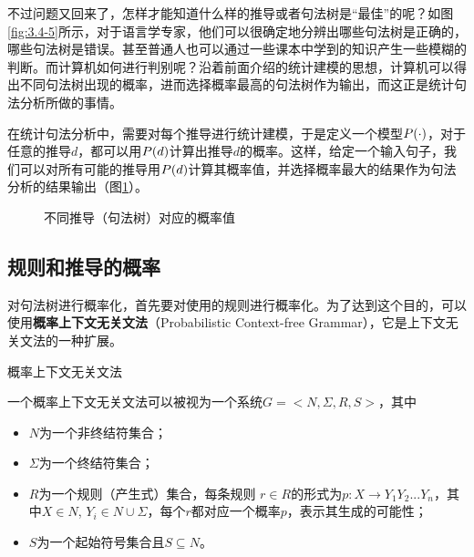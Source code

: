 \parinterval 不过问题又回来了，怎样才能知道什么样的推导或者句法树是“最佳”的呢？如图\ref{fig:3.4-5}所示，对于语言学专家，他们可以很确定地分辨出哪些句法树是正确的，哪些句法树是错误。甚至普通人也可以通过一些课本中学到的知识产生一些模糊的判断。而计算机如何进行判别呢？沿着前面介绍的统计建模的思想，计算机可以得出不同句法树出现的概率，进而选择概率最高的句法树作为输出，而这正是统计句法分析所做的事情。

\parinterval 在统计句法分析中，需要对每个推导进行统计建模，于是定义一个模型${P}( \cdot )$，对于任意的推导$d$，都可以用${P}(d)$计算出推导$d$的概率。这样，给定一个输入句子，我们可以对所有可能的推导用${P}(d)$计算其概率值，并选择概率最大的结果作为句法分析的结果输出（图\ref{fig:3.4-6}）。

\begin{figure}[htp]
    \centering

	\caption{不同推导（句法树）对应的概率值}
    \label{fig:3.4-6}
\end{figure}


\subsection{规则和推导的概率}

\parinterval 对句法树进行概率化，首先要对使用的规则进行概率化。为了达到这个目的，可以使用{\small\sffamily\bfseries{概率上下文无关文法}}（Probabilistic Context-free Grammar），它是上下文无关文法的一种扩展。

\vspace{0.5em}
\begin{definition} 概率上下文无关文法

一个概率上下文无关文法可以被视为一个系统$G=<N,\varSigma,R,S>$，其中
\begin{itemize}
\vspace{0.5em}
\item $N$为一个非终结符集合；
\vspace{0.5em}
\item $\varSigma$为一个终结符集合；
\vspace{0.5em}
\item $R$为一个规则（产生式）集合，每条规则 $r \in R$的形式为$p:X \to Y_1Y_2...Y_n$，其中$X \in N$, $Y_i \in N \cup \varSigma$，每个$r$都对应一个概率$p$，表示其生成的可能性；
\vspace{0.5em}
\item $S$为一个起始符号集合且$S \subseteq N$。
\vspace{0.5em}
\end{itemize}
\end{definition}

